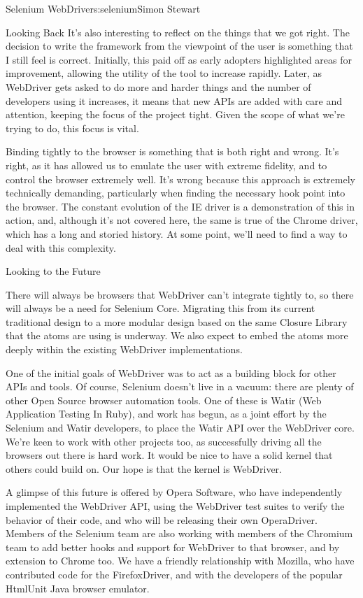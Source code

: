\begin{aosachapter}{Selenium WebDriver}{s:selenium}{Simon Stewart}
\begin{aosasect1}{Looking Back}
It's also interesting to reflect on the things that we got right. The
decision to write the framework from the viewpoint of the user is
something that I still feel is correct. Initially, this paid off as
early adopters highlighted areas for improvement, allowing the utility
of the tool to increase rapidly. Later, as WebDriver gets asked to do
more and harder things and the number of developers using it
increases, it means that new APIs are added with care and attention,
keeping the focus of the project tight. Given the scope of what we're
trying to do, this focus is vital.

Binding tightly to the browser is something that is both right and
wrong.  It's right, as it has allowed us to emulate the user with
extreme fidelity, and to control the browser extremely well. It's
wrong because this approach is extremely technically demanding,
particularly when finding the necessary hook point into the
browser. The constant evolution of the IE driver is a demonstration of
this in action, and, although it's not covered here, the same is true
of the Chrome driver, which has a long and storied history. At some
point, we'll need to find a way to deal with this complexity.

\end{aosasect1}

\begin{aosasect1}{Looking to the Future}

There will always be browsers that WebDriver can't integrate tightly
to, so there will always be a need for Selenium Core. Migrating this
from its current traditional design to a more modular design based on
the same Closure Library that the atoms are using is underway. We also
expect to embed the atoms more deeply within the existing WebDriver
implementations.

One of the initial goals of WebDriver was to act as a building block
for other APIs and tools. Of course, Selenium doesn't live in a
vacuum: there are plenty of other Open Source browser automation
tools. One of these is Watir (Web Application Testing In Ruby), and
work has begun, as a joint effort by the Selenium and Watir
developers, to place the Watir API over the WebDriver core. We're keen
to work with other projects too, as successfully driving all the
browsers out there is hard work. It would be nice to have a solid
kernel that others could build on. Our hope is that the kernel is
WebDriver.

A glimpse of this future is offered by Opera Software, who have
independently implemented the WebDriver API, using the WebDriver test
suites to verify the behavior of their code, and who will be
releasing their own OperaDriver. Members of the Selenium team are also
working with members of the Chromium team to add better hooks and
support for WebDriver to that browser, and by extension to Chrome
too. We have a friendly relationship with Mozilla, who have
contributed code for the FirefoxDriver, and with the developers of the
popular HtmlUnit Java browser emulator.


\end{aosasect1}
\end{aosachapter}
